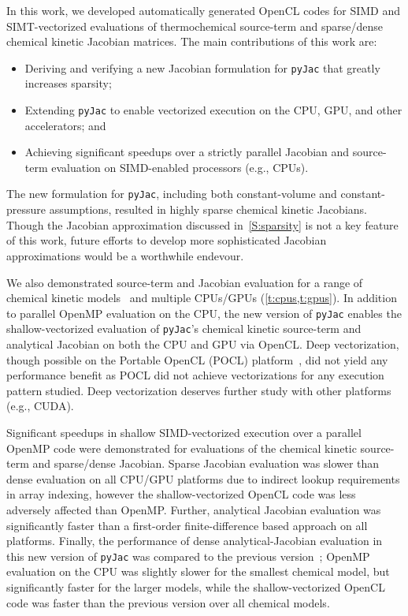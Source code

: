 \documentclass[12pt,number,sort&compress,preprint]{elsarticle}
\newcommand{\revise}[1]{{\sloppy\textcolor{RoyalPurple}{#1}}}  %
\begin{document}
In this work, we developed automatically generated OpenCL codes for SIMD and SIMT-vectorized evaluations of thermochemical source-term and sparse\slash dense chemical kinetic Jacobian matrices.
\revise{The main contributions of this work are:}
\begin{itemize}
 \item \revise{Deriving and verifying a new Jacobian formulation for \texttt{pyJac} that greatly increases sparsity;}
 \item \revise{Extending \texttt{pyJac} to enable vectorized execution on the CPU, GPU, and other accelerators; and}
 \item \revise{Achieving significant speedups over a strictly parallel Jacobian and source-term evaluation on SIMD-enabled processors (e.g., CPUs).}
\end{itemize}

\revise{The new formulation for \texttt{pyJac}, including both constant-volume and constant-pressure assumptions, resulted in highly sparse chemical kinetic Jacobians.
Though the Jacobian approximation discussed in~\cref{S:sparsity} is not a key feature of this work, future efforts to develop more sophisticated Jacobian approximations would be a worthwhile endevour.}

We also demonstrated source-term and Jacobian evaluation for a range of chemical kinetic models~\cite{Burke:2011fh,smith_gri-mech_30,Wang:2007,Sarathy:2013jr} and multiple CPUs\slash GPUs (\cref{t:cpus,t:gpus}).
\revise{In addition to parallel OpenMP evaluation on the CPU, the new version of \texttt{pyJac} enables the shallow-vectorized evaluation of \texttt{pyJac}'s chemical kinetic source-term and analytical Jacobian on both the CPU and GPU via OpenCL.}
Deep vectorization, though possible on the Portable OpenCL (POCL) platform~\cite{poclIJPP}, did not yield any performance benefit as POCL did not achieve vectorizations for any execution pattern studied.
Deep vectorization deserves further study with other platforms (e.g., CUDA).

Significant speedups in shallow SIMD-vectorized execution over a parallel OpenMP code were demonstrated for evaluations of the chemical kinetic source-term and sparse\slash dense Jacobian.
Sparse Jacobian evaluation was slower than dense evaluation on all CPU\slash GPU platforms due to indirect lookup requirements in array indexing, however the shallow-vectorized OpenCL code was less adversely affected than OpenMP.
Further, analytical Jacobian evaluation was significantly faster than a first-order finite-difference based approach on all platforms.
Finally, the performance of dense analytical-Jacobian evaluation in this new version of \texttt{pyJac} was compared to the previous version~\cite{pyjac16}; OpenMP evaluation on the CPU was slightly slower for the smallest chemical model, but significantly faster for the larger models, while the shallow-vectorized OpenCL code was faster than the previous version over all chemical models.
\end{document}
